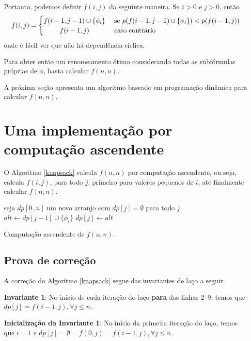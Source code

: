 Portanto, podemos definir $f(i,j)$ da seguinte maneira. Se $i > 0$ e $j > 0$, então
\[
f(i,j) =
\begin{cases} 
\hfill f(i-1,j-1) \cup \{\phi_i \}   \hfill & \text{ se } p(f(i-1,j-1) \cup \{\phi_i \}) < p(f(i-1,j)) \\
\hfill f(i-1,j) \hfill & \text{ caso contrário} \\
\end{cases}
\]
onde é fácil ver que não há dependência cíclica.

Para obter então um renomeamento ótimo considerando todas as subfórmulas próprias de $\phi$, basta calcular $f(n,n)$.

A próxima seção apresenta um algoritmo baseado em programação dinâmica \cite{bellman2015applied} para calcular $f(n,n)$.

\section{Uma implementação por computação ascendente}

\indent

O Algoritmo \ref{knapsack} calcula $f(n,n)$ por computação ascendente, ou seja, calcula $f(i,j)$, para todo $j$, primeiro para valores pequenos de $i$, até finalmente calcular $f(n,n)$.

\begin{algorithm}
	\begin{algorithmic}[1]
		\State seja $dp[0..n]$ um novo arranjo com $dp[j] = \emptyset$ para todo $j$
				\State $alt \gets dp[j-1] \cup \{\phi_i\}$
					\State $dp[j] \gets alt$
				\EndIf
			\EndFor
		\EndFor
	\end{algorithmic}
	\caption{Computação ascendente de $f(n,n)$.}
	\label{knapsack}
\end{algorithm}

\subsection{Prova de correção}

\indent

A correção do Algoritmo \ref{knapsack} segue das invariantes de laço a seguir.

\textbf{Invariante 1}: No início de cada iteração do laço \textbf{para} das linhas 2--9, temos que $dp[j] = f(i-1,j), \forall j \leq n$.

\textbf{Inicialização da Invariante 1}: No início da primeira iteração do laço, temos que $i = 1$ e $dp[j] = \emptyset = f(0,j) = f(i-1,j), \forall j \leq n$. 

